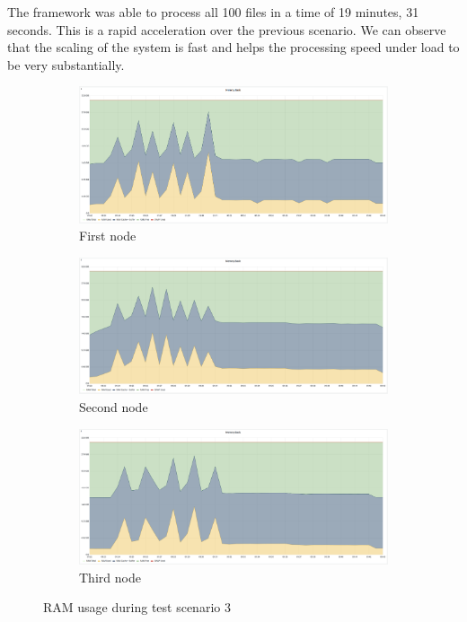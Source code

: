 The framework was able to process all 100 files in a time of 19 minutes, 31 seconds. This is a rapid acceleration over the previous scenario. We can observe that the scaling of the system is fast and helps the processing speed under load to be very substantially.

\begin{figure}[H]
    \begin{subfigure}[h]{0.5\linewidth}
        \centering
        \includegraphics[width=1\linewidth]{other-fig/tests/overload_ram1.png}
        \caption{First node}
    \end{subfigure}
    \hfill
    \begin{subfigure}[h]{0.5\linewidth}
        \centering
        \includegraphics[width=1\linewidth]{other-fig/tests/overload_ram2.png}
        \caption{Second node}
    \end{subfigure}
    \begin{subfigure}[h]{1\linewidth}
        \centering
        \includegraphics[width=0.5\linewidth]{other-fig/tests/overload_ram3.png}
        \caption{Third node}
    \end{subfigure}
    \caption{RAM usage during test scenario 3}
    \label{fig:burst_ram}
\end{figure}

